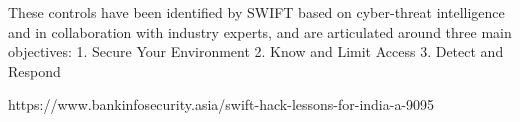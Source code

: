 \documentclass[12pt]{article}
\begin{document}
        These controls have been identified by SWIFT based on cyber-threat intelligence and in collaboration with industry experts, and are articulated around three main objectives:
        1. Secure Your Environment 
        2. Know and Limit Access 
        3. Detect and Respond
        
        https://www.bankinfosecurity.asia/swift-hack-lessons-for-india-a-9095
        

\begin{flushright}
 \end{flushright}
\newpage
\printbibliography[heading=bibintoc]
\end{document}
